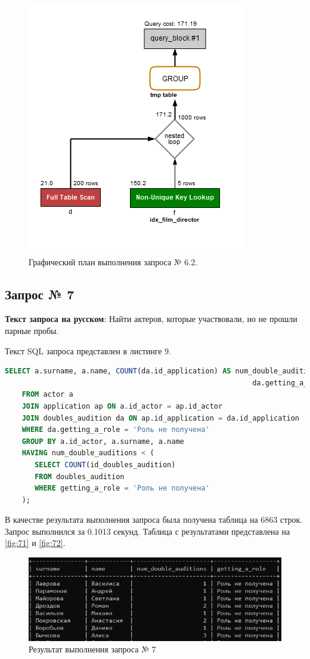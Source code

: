 \documentclass[11pt,a4paper,final]{article} %
\begin{document}
\begin{figure}[H]
	\centering
	\includegraphics[width=0.5\linewidth]{ex62.png}
	\caption{Графический план выполнения запроса № 6.2.}
	\label{fig:ex62}
\end{figure}

\subsection{Запрос № 7}

\par \textbf{Текст запроса на русском}: Найти актеров, которые участвовали, но не прошли парные пробы. 
\par Текст SQL запроса представлен в листинге 9.

\begin{lstlisting}[caption=SQL запрос № 7, language=SQL]
	SELECT a.surname, a.name, COUNT(da.id_application) AS num_double_auditions,  
	                                                      da.getting_a_role
	FROM actor a
	JOIN application ap ON a.id_actor = ap.id_actor
	JOIN doubles_audition da ON ap.id_application = da.id_application
	WHERE da.getting_a_role = 'Роль не получена'
	GROUP BY a.id_actor, a.surname, a.name
	HAVING num_double_auditions < (
	   SELECT COUNT(id_doubles_audition)
	   FROM doubles_audition
  	   WHERE getting_a_role = 'Роль не получена'
	);
\end{lstlisting}

\par В качестве результата выполнения запроса была получена таблица на 6863 строк. Запрос выполнился за 0.1013 секунд. Таблица с результатами представлена на \autoref{fig:71} и \autoref{fig:72}.

\begin{figure}[H]
	\centering
	\includegraphics[width=0.7\linewidth]{71.png}
	\caption{Результат выполнения запроса № 7}
	\label{fig:71}
\end{figure}
\end{document}
